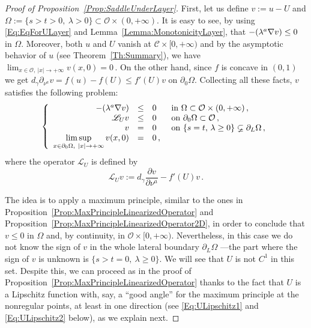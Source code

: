 \documentclass[12pt,reqno]{amsart}
\theoremstyle{definition}
\theoremstyle{remark}
\newcommand{\ccal}{\mathscr{C}}
\newcommand{\ocal}{\mathcal{O}}
\newcommand{\s}{\gamma}
\newcommand\beqc[1]{\left\{\begin{array}{#1}}
\newcommand\eeqc{\end{array} \right.}
\def\PDEsystem{rcll}
\let\div\relax
\DeclareMathOperator{\div}{div}
\def\ds{\displaystyle}
\numberwithin{equation}{section}
\begin{document}

\begin{proof}[Proof of Proposition~\ref{Prop:SaddleUnderLayer}]
First, let us define $v:= u - U$ and $\Omega := \{s>t>0, \ \lambda > 0\} \subset \ocal \times (0, +\infty)$. It is easy to see, by using \eqref{Eq:EqForULayer} and Lemma~\ref{Lemma:MonotonicityLayer}, that $-\div (\lambda^a \nabla v) \leq 0$ in $\Omega$. Moreover, both $u$ and $U$ vanish at $\ccal \times [0,+\infty)$ and by the asymptotic behavior of $u$ (see Theorem~\ref{Th:Summary}), we have $\lim_{x\in  \ocal,\ |x|\to +\infty} v(x,0) = 0\,$. On the other hand, since $f$ is concave in $(0,1)$ we get $d_\s \partial_{\nu^a} v = f(u) - f(U) \leq f'(U)v$ on $\partial_0 \Omega$. Collecting all these facts, $v$ satisfies the following problem:
$$
\beqc{\PDEsystem}
-\div(\lambda^a \nabla v) &\leq& 0 & \text{ in } \Omega \subset \ocal \times (0,+\infty)\,, \\
\mathscr{L}_U v &\leq & 0 & \text{ on } \partial_0 \Omega \subset \ocal \,, \\
v & = & 0 & \text{ on } \{s=t,\, \lambda \geq 0\}\varsubsetneq\partial_L \Omega \,,\\
\ds \limsup_{x\in \partial_0 \Omega, \ |x|\to +\infty} v(x,0) & = & 0\,,
\eeqc
$$
where the operator $\mathscr{L}_U$ is defined by 
$$
\mathscr{L}_U v := d_\s \dfrac{\partial v}{\partial \nu^a}  -f'(U) v \,.
$$

The idea is to apply a maximum principle, similar to the ones in Proposition~\ref{Prop:MaxPrincipleLinearizedOperator} and Proposition~\ref{Prop:MaxPrincipleLinearizedOperator2D}, in order to conclude that $v\leq 0$ in $\Omega$ and, by continuity, in $\ocal\times[0,+\infty)$. Nevertheless, in this case we do not know the sign of $v$ in the whole lateral boundary $\partial_L \Omega$ ---the part where the sign of $v$ is unknown is $\{s > t= 0,\ \lambda \geq 0\}$. We will see that $U$ is not $C^1$ in this set. Despite this, we can proceed as in the proof of Proposition~\ref{Prop:MaxPrincipleLinearizedOperator} thanks to the fact that $U$ is a Lipschitz function with, say, a ``good angle'' for the maximum principle at the nonregular points, at least in one direction (see \eqref{Eq:ULipschitz1} and \eqref{Eq:ULipschitz2} below), as we explain next.



\end{proof}
\end{document}
